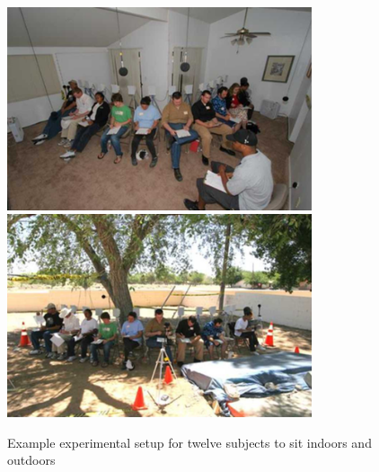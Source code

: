 \documentclass[]{aiaa-tc}%
\begin{document}
\begin{figure}[tb!]
  \centering
  \includegraphics[width=0.8\textwidth]{figs/indoors.png}
  \includegraphics[width=0.8\textwidth]{figs/outdoors.png}
  \caption{Example experimental setup for twelve subjects to sit indoors and outdoors~\cite{sullivan2010human}}
  \label{fig:indoors-and-outdoors}
\end{figure}
\end{document}
